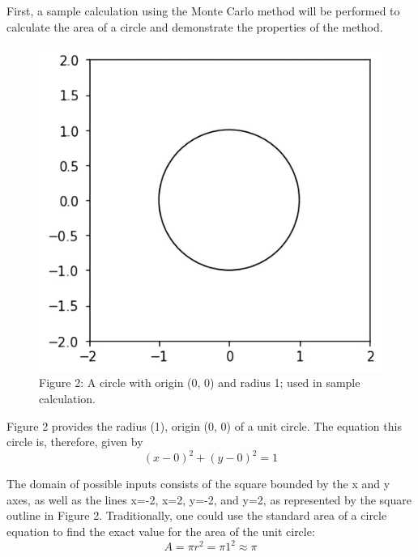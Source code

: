 \documentclass[11pt]{article}
\begin{document}
First, a sample calculation using the Monte Carlo method will be performed to calculate the area of a circle and demonstrate the properties of the method.
\begin{figure}[h]
\includegraphics[scale=.2]{circle_clear}
\centering\\
\footnotesize\centering Figure 2: A circle with origin (0, 0) and radius 1; used in sample calculation. 
\end{figure}

Figure 2 provides the radius (1), origin (0, 0) of a unit circle. The equation this circle is, therefore, given by\\[-7ex]

\[(x-0)^2+(y-0)^2=1\]

The domain of possible inputs consists of the square bounded by the x and y axes, as well as the lines x=-2, x=2, y=-2, and y=2, as represented by the square outline in Figure 2. Traditionally, one could use the standard area of a circle equation to find the exact value for the area of the unit circle:\\[-7ex]

\[A=\pi r^2=\pi 1^2 \approx \boxed{\pi}\]
\end{document}
